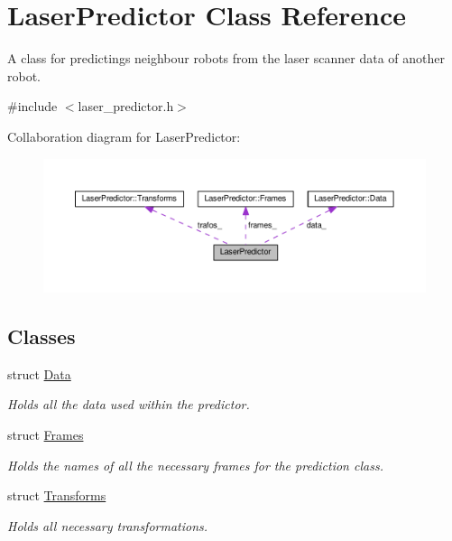 \hypertarget{classLaserPredictor}{}\section{Laser\+Predictor Class Reference}
\label{classLaserPredictor}


A class for predictings neighbour robots from the laser scanner data of another robot.  




{\ttfamily \#include $<$laser\+\_\+predictor.\+h$>$}



Collaboration diagram for Laser\+Predictor\+:\nopagebreak
\begin{figure}[H]
\begin{center}
\leavevmode
\includegraphics[width=350pt]{classLaserPredictor__coll__graph}
\end{center}
\end{figure}
\subsection*{Classes}
\begin{DoxyCompactItemize}
\item 
struct \hyperlink{structLaserPredictor_1_1Data}{Data}
\begin{DoxyCompactList}\small\item\em Holds all the data used within the predictor. \end{DoxyCompactList}\item 
struct \hyperlink{structLaserPredictor_1_1Frames}{Frames}
\begin{DoxyCompactList}\small\item\em Holds the names of all the necessary frames for the prediction class. \end{DoxyCompactList}\item 
struct \hyperlink{structLaserPredictor_1_1Transforms}{Transforms}
\begin{DoxyCompactList}\small\item\em Holds all necessary transformations. \end{DoxyCompactList}\end{DoxyCompactItemize}

